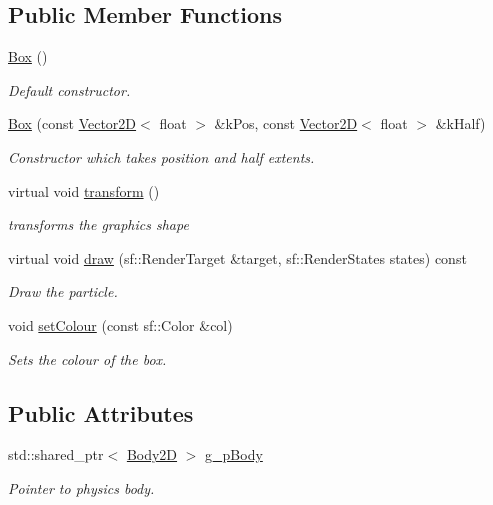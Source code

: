 \subsection*{Public Member Functions}
\begin{DoxyCompactItemize}
\item 
\hypertarget{class_box_aca78d7db44972bfa78d46b7bbc8796f6}{\hyperlink{class_box_aca78d7db44972bfa78d46b7bbc8796f6}{Box} ()}\label{class_box_aca78d7db44972bfa78d46b7bbc8796f6}

\begin{DoxyCompactList}\small\item\em Default constructor. \end{DoxyCompactList}\item 
\hyperlink{class_box_a11407004870f99a8b547e20d23bb5543}{Box} (const \hyperlink{class_vector2_d}{Vector2\+D}$<$ float $>$ \&k\+Pos, const \hyperlink{class_vector2_d}{Vector2\+D}$<$ float $>$ \&k\+Half)
\begin{DoxyCompactList}\small\item\em Constructor which takes position and half extents. \end{DoxyCompactList}\item 
\hypertarget{class_box_a84f26740f48268acf088360c0f288290}{virtual void \hyperlink{class_box_a84f26740f48268acf088360c0f288290}{transform} ()}\label{class_box_a84f26740f48268acf088360c0f288290}

\begin{DoxyCompactList}\small\item\em transforms the graphics shape \end{DoxyCompactList}\item 
virtual void \hyperlink{class_box_a170ec052134afb6dd70571b603d0e4a5}{draw} (sf\+::\+Render\+Target \&target, sf\+::\+Render\+States states) const 
\begin{DoxyCompactList}\small\item\em Draw the particle. \end{DoxyCompactList}\item 
void \hyperlink{class_box_ad83a96038d40168e90c3324e3b0125d3}{set\+Colour} (const sf\+::\+Color \&col)
\begin{DoxyCompactList}\small\item\em Sets the colour of the box. \end{DoxyCompactList}\end{DoxyCompactItemize}
\subsection*{Public Attributes}
\begin{DoxyCompactItemize}
\item 
\hypertarget{class_box_af7719c046c9377f48c020b5cbc763f85}{std\+::shared\+\_\+ptr$<$ \hyperlink{class_body2_d}{Body2\+D} $>$ \hyperlink{class_box_af7719c046c9377f48c020b5cbc763f85}{g\+\_\+p\+Body}}\label{class_box_af7719c046c9377f48c020b5cbc763f85}

\begin{DoxyCompactList}\small\item\em Pointer to physics body. \end{DoxyCompactList}\end{DoxyCompactItemize}
